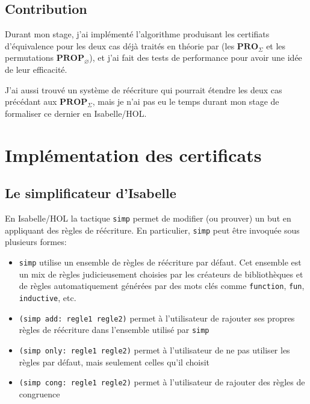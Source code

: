 \documentclass[12pt, a4paper]{article}
\def\pro#1{ \mathbf{PRO}_{ #1 } }
\def\prop#1{ \mathbf{PROP}_{ #1 } }
\begin{document}
\subsection{Contribution}

Durant mon stage, j'ai implémenté l'algorithme produisant les certifiats d'équivalence pour les deux cas déjà traités en théorie par \cite{terms} (les $\pro{\Sigma}$ et les permutations $\prop{\varnothing}$), et j'ai fait des tests de performance pour avoir une idée de leur efficacité.

J'ai aussi trouvé un système de réécriture qui pourrait étendre les deux cas précédant aux $\prop{\Sigma}$, mais je n'ai pas eu le temps durant mon stage de formaliser ce dernier en Isabelle/HOL.

\section{Implémentation des certificats}

\subsection{Le simplificateur d'Isabelle}

En Isabelle/HOL la tactique \lstinline[language=Isar]|simp| permet de modifier (ou prouver) un but en appliquant des règles de réécriture. En particulier, \lstinline[language=Isar]|simp| peut être invoquée sous plusieurs formes:
\begin{itemize}
    \item \lstinline[language=Isar]|simp| utilise un ensemble de règles de réécriture par défaut. Cet ensemble est un mix de règles judicieusement choisies par les créateurs de bibliothèques et de règles automatiquement générées par des mots clés comme \lstinline[language=Isar]|function|, \lstinline[language=Isar]|fun|, \lstinline[language=Isar]|inductive|, etc.
    \item \lstinline[language=Isar]|(simp add: regle1 regle2)| permet à l'utilisateur de rajouter ses propres règles de réécriture dans l'ensemble utilisé par \lstinline[language=Isar]|simp|
    \item \lstinline[language=Isar]|(simp only: regle1 regle2)| permet à l'utilisateur de ne pas utiliser les règles par défaut, mais seulement celles qu'il choisit
    \item \lstinline[language=Isar]|(simp cong: regle1 regle2)| permet à l'utilisateur de rajouter des règles de congruence
\end{itemize}
\end{document}
